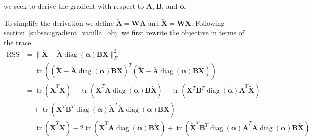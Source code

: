 \documentclass[oneside]{article}
\begin{document}
we seek to derive the gradient with respect to $\mathbf{A}$, $\mathbf{B}$, and $\boldsymbol{\alpha}$.

To simplify the derivation we define $\breve{\mathbf{A}} = \mathbf{W} \mathbf{A}$ and $\breve{\mathbf{X}} = \mathbf{W} \mathbf{X}$. Following section~\ref{subsec:gradient_vanilla_obj} we first rewrite the objective in terms of the trace.
\begin{equation}
    \label{eq:relaxed_weighted_objective_trace}
    \begin{aligned}
        \operatorname{RSS} &= \| \breve{\mathbf{X}} - \breve{\mathbf{A}} \operatorname{diag}(\boldsymbol{\alpha}) \mathbf{B} \tilde{\mathbf{X}} \|_F^2 \\
        &= \operatorname{tr} \left( \left( \breve{\mathbf{X}} - \breve{\mathbf{A}} \operatorname{diag}(\boldsymbol{\alpha}) \mathbf{B} \tilde{\mathbf{X}} \right)^T
            \left( \breve{\mathbf{X}} - \breve{\mathbf{A}} \operatorname{diag}(\boldsymbol{\alpha}) \mathbf{B} \tilde{\mathbf{X}} \right) \right) \\
        &= \operatorname{tr} \left( \breve{\mathbf{X}}^T \breve{\mathbf{X}} \right)
            - \operatorname{tr} \left( \breve{\mathbf{X}}^T \breve{\mathbf{A}} \operatorname{diag}(\boldsymbol{\alpha}) \mathbf{B} \tilde{\mathbf{X}} \right)
            - \operatorname{tr} \left( \mathbf{X}^T \mathbf{B}^T \operatorname{diag}(\boldsymbol{\alpha}) \breve{\mathbf{A}}^T \tilde{\mathbf{X}} \right) \\
        &\quad + \operatorname{tr} \left( \mathbf{X}^T \mathbf{B}^T \operatorname{diag}(\boldsymbol{\alpha}) \breve{\mathbf{A}}^T \breve{\mathbf{A}} \operatorname{diag}(\boldsymbol{\alpha}) \mathbf{B} \mathbf{X} \right) \\
        &= \operatorname{tr}\left( \breve{\mathbf{X}}^T \breve{\mathbf{X}} \right)
            - 2 \operatorname{tr} \left( \breve{\mathbf{X}}^T \breve{\mathbf{A}} \operatorname{diag}(\boldsymbol{\alpha}) \mathbf{B} \tilde{\mathbf{X}} \right)
            + \operatorname{tr} \left( \tilde{\mathbf{X}}^T \mathbf{B}^T \operatorname{diag}(\boldsymbol{\alpha}) \breve{\mathbf{A}}^T \breve{\mathbf{A}} \operatorname{diag}(\boldsymbol{\alpha}) \mathbf{B} \tilde{\mathbf{X}} \right) \\
    \end{aligned}
\end{equation}
\end{document}
